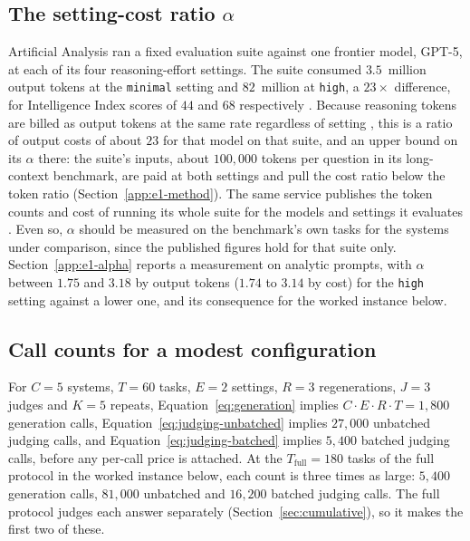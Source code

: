 \documentclass[11pt]{article}
\begin{document}
\subsection{The setting-cost ratio \texorpdfstring{$\alpha$}{alpha}}

Artificial Analysis ran a fixed evaluation suite against one frontier model, GPT-5, at
each of its four reasoning-effort settings. The suite consumed $3.5$~million output
tokens at the \texttt{minimal} setting and $82$~million at \texttt{high}, a $23\times$ difference, for Intelligence Index scores of $44$ and $68$ respectively
\citep{aagpt5benchmarks2025}. Because reasoning tokens are billed as output tokens at the
same rate regardless of setting \citep{openai2026reasoning, anthropic2026thinking}, this
is a ratio of output costs of about $23$ for that model on that suite, and an upper bound on its $\alpha$ there: the suite's inputs, about $100{,}000$ tokens per question in its long-context benchmark, are paid at both settings and pull the cost ratio below the token ratio (Section~\ref{app:e1-method}). The same service publishes
the token counts and cost of running its whole suite for the models and settings it evaluates \citep{aaintelligence}. Even so, $\alpha$ should
be measured on the benchmark's own tasks for the systems under comparison, since the published figures hold for that suite only. Section~\ref{app:e1-alpha}
reports a measurement on analytic prompts, with $\alpha$ between $1.75$ and $3.18$ by output tokens ($1.74$ to $3.14$ by cost) for the \texttt{high} setting against a lower one, and its consequence for the worked instance below.

\subsection{Call counts for a modest configuration}

For $C = 5$ systems, $T = 60$ tasks, $E = 2$ settings, $R = 3$ regenerations, $J = 3$
judges and $K = 5$ repeats, Equation~\ref{eq:generation} implies $C \cdot E \cdot R \cdot
T = 1{,}800$ generation calls, Equation~\ref{eq:judging-unbatched} implies $27{,}000$
unbatched judging calls, and Equation~\ref{eq:judging-batched} implies $5{,}400$ batched
judging calls, before any per-call price is attached. At the $T_{\text{full}} = 180$ tasks of the full protocol in the worked instance below, each count is three times as large: $5{,}400$ generation calls, $81{,}000$ unbatched and $16{,}200$ batched judging calls. The full protocol judges each answer separately (Section~\ref{sec:cumulative}), so it makes the first two of these.
\end{document}
